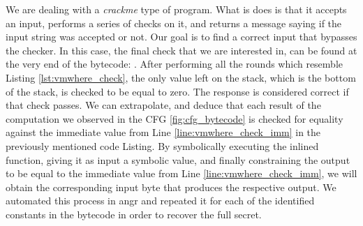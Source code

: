 We are dealing with a \emph{crackme} type of program. What is does is that it accepts an input, performs a series of checks on it, and returns a message saying if the input string was accepted or not. Our goal is to find a correct input that bypasses the checker. In this case, the final check that we are interested in, can be found at the very end of the bytecode: . After performing all the rounds which resemble Listing \ref{lst:vmwhere_check}, the only value left on the stack, which is the bottom of the stack, is checked to be equal to zero. The response is considered correct if that check passes. We can extrapolate, and deduce that each result of the computation we observed in the \gls{CFG} \ref{fig:cfg_bytecode} is checked for equality against the immediate value from Line \ref{line:vmwhere_check_imm} in the previously mentioned code Listing. By symbolically executing the inlined function, giving it as input a symbolic value, and finally constraining the output to be equal to the immediate value \cc{\xZZ} from Line \ref{line:vmwhere_check_imm}, we will obtain the corresponding input byte that produces the respective output. We automated this process in angr and repeated it for each of the identified constants in the bytecode in order to recover the full secret.


